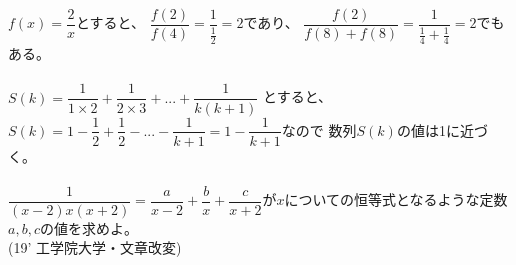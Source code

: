 \documentclass{ltjsarticle}
\begin{document}
\noindent
$f(x)=\dfrac{2}{x}$とすると、
$\dfrac{f(2)}{f(4)}=\dfrac{1}{\frac{1}{2}}=2$であり、
$\dfrac{f(2)}{f(8)+f(8)}=\dfrac{1}{\frac{1}{4}+\frac{1}{4}}=2$でもある。
\\ \\
\noindent
$S(k)=\dfrac{1}{1\times 2}+\dfrac{1}{2\times 3}+...+\dfrac{1}{k(k+1)}$
とすると、$S(k)=1-\dfrac{1}{2}+\dfrac{1}{2}-...-\dfrac{1}{k+1}=1-\dfrac{1}{k+1}$なので
数列$S(k)$の値は1に近づく。
\\ \\
$\dfrac{1}{(x-2)x(x+2)}=\dfrac{a}{x-2}+\dfrac{b}{x}+\dfrac{c}{x+2}$が$x$についての恒等式となるような定数$a,b,c$の値を求めよ。\\
\hfill (19' 工学院大学・文章改変)
\noindent
\end{document}
